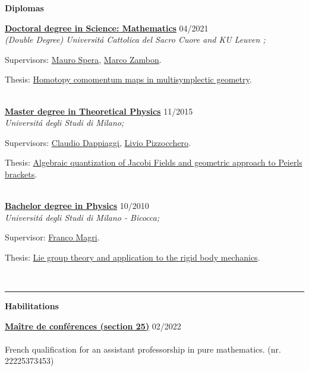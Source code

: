 \documentclass[a4paper]{article}
\newcommand{\block}[1]{\hrule \vspace{0.2cm} \textbf{\Large #1} \vspace{0.2cm}}
\newcommand{\blockNp}[1]{\newpage \textbf{\Large #1} \vspace{0.2cm}}
\newcommand{\voice}[5]{\href{#4}{\textbf{#1}} \hfill #2 \\ \textit{#3} \\ {\small #5} \vspace{0.2cm} \\}
\begin{document}

	\blockNp{Diplomas}

	\voice{Doctoral degree in Science: Mathematics}
		{04/2021}
		{(Double Degree) Universit\'a Cattolica del Sacro Cuore and KU Leuven ;}
		{https://web.archive.org/save/http://scuoledidottorato.unicatt.it/phdschools/science-research-projects}       
		{Supervisors: \href{http://docenti.unicatt.it/ita/mauro_spera/}{Mauro Spera}, \href{https://perswww.kuleuven.be/~u0096206/}{Marco Zambon}. \par Thesis: \href{https://limo.libis.be/primo-explore/fulldisplay?docid=LIRIAS3408626&context=L&vid=KULeuven&search_scope=ALL_CONTENT&tab=all_content_tab&lang=en_US}{Homotopy comomentum maps in multisymplectic geometry}.}
	\voice{Master degree in Theoretical Physics}
		{11/2015}
		{Universit\'a degli Studi di Milano;}
		{https://fisica-lm.cdl.unimi.it/it}       
		{Supervisors: \href{http://fisica.unipv.it/personale/Persona.php?ID=256}{Claudio Dappiaggi}, \href{http://users.mat.unimi.it/users/pizzocchero/}{Livio Pizzocchero}. \par Thesis: \href{https://www.researchgate.net/publication/295548746_Algebraic_quantization_of_Jacobi_fields_and_geometric_approach_to_Peierls_brackets}{Algebraic quantization of Jacobi Fields and geometric approach to Peierls brackets}.}
	\voice{Bachelor degree in Physics}
		{10/2010}
		{Universit\'a degli Studi di Milano - Bicocca;}
		{https://www.fisica.unimib.it/en}       
		{Supervisor: \href{http://staff.matapp.unimib.it/~/magri/}{Franco Magri}. \par Thesis: \href{https://github.com/MasterToninus/TesiTriennale/blob/master/tesi.pdf}{Lie group theory and application to the rigid body mechanics}.}


	\block{Habilitations}

	\voice{Maître de conférences (section 25)}
		{02/2022}
		{\vspace{-0.5cm}}
		{https://www.galaxie.enseignementsup-recherche.gouv.fr/ensup/qualification/Resultats_2022/qualifies_MCF_2022.pdf}       
		{French qualification for an assistant professorship in pure mathematics.  (nr. 22225373453)}
\end{document}
